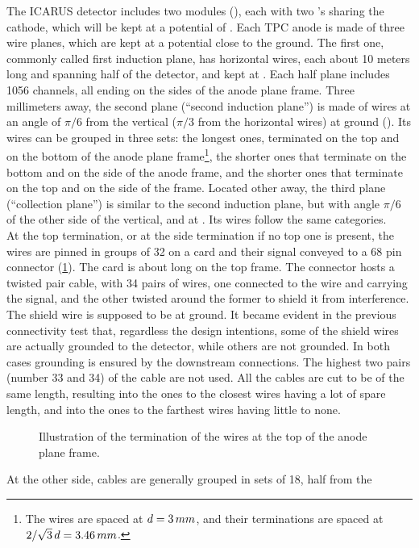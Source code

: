 The ICARUS detector includes two modules (\ICARUSmodule), each with two \TPC's
sharing the cathode, which will be kept at a potential of .
Each TPC anode is made of three wire planes, which are kept at a potential close
to the ground.
The first one, commonly called first induction plane, has horizontal wires, each
about 10 meters long and spanning half of the detector, and kept at .
Each half plane includes 1056 channels, all ending on the sides of the anode
plane frame.
Three millimeters away, the second plane (``second induction plane'') is made of
wires at an angle of $\pi/6$ from the vertical ($\pi/3$ from the horizontal
wires) at ground ().
Its wires can be grouped in three sets: the longest ones, terminated on the top
and on the bottom of the anode plane frame\footnote{%
The wires are spaced at $d=3\,mm$, and their terminations are spaced at
$2/\sqrt{3}\,d=3.46\,mm$.%
},
the shorter ones that terminate on the bottom and on the side of the anode
frame, and the shorter ones that terminate on the top and on the side of the
frame.
Located other  away, the third plane (``collection plane'') is similar to
the second induction plane, but with angle $\pi/6$ of the other side of the
vertical, and at . Its wires follow the same categories.
\\
At the top termination, or at the side termination if no top one is present,
the wires are pinned in groups of 32 on a card and their signal conveyed to a
68 pin connector (\cref{fig:TopTermination}).
The card is about  long on the top frame.
The connector hosts a twisted pair cable, with 34 pairs of wires, one connected
to the wire and carrying the signal, and the other twisted around the former to
shield it from interference.
The shield wire is supposed to be at ground.
It became evident in the previous connectivity test that, regardless the design
intentions, some of the shield wires are actually grounded to the detector,
while others are not grounded.
In both cases grounding is ensured by the downstream connections.
The highest two pairs (number 33 and 34) of the cable are not used.
All the cables are cut to be of the same length, resulting into the ones to the
closest wires having a lot of spare length, and into the ones to the farthest
wires having little to none.
\begin{figure}
  \caption{\label{fig:TopTermination}
    Illustration of the termination of the wires at the top of the anode plane
    frame.
  }
\end{figure}
At the other side, cables are generally grouped in sets of 18, half from the
